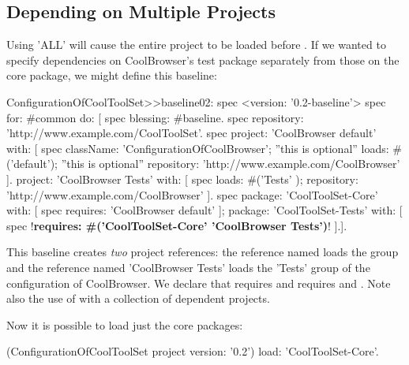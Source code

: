 \documentclass[a4paper,10pt,twoside]{book}
\begin{document}
\subsection{Depending on Multiple Projects}

Using 'ALL' will cause the entire  project to be loaded before .
If we wanted to specify dependencies on CoolBrowser's test package separately from those on the core package, we might define this baseline:

\begin{code}{}
ConfigurationOfCoolToolSet>>baseline02: spec
       <version: '0.2-baseline'>
       spec for: #common do: [
              spec blessing: #baseline.
              spec repository: 'http://www.example.com/CoolToolSet'.
              spec
                    project: 'CoolBrowser default' with: [
                            spec
                                   className: 'ConfigurationOfCoolBrowser'; ''this is optional''
                                   loads: #('default');  ''this is optional''
                                   repository: 'http://www.example.com/CoolBrowser' ].
                    project: 'CoolBrowser Tests' with: [
                            spec
                                   loads: #('Tests' );
                                   repository: 'http://www.example.com/CoolBrowser' ].
              spec
                     package: 'CoolToolSet-Core' with: [ spec requires: 'CoolBrowser default' ];
                     package: 'CoolToolSet-Tests' with: [
                            spec !\textbf{requires: \#('CoolToolSet-Core'  'CoolBrowser Tests')}! ].].
\end{code}

This baseline creates \emph{two} project references: the reference named  loads the  group and the reference named 'CoolBrowser Tests'  loads the 'Tests' group of the configuration of CoolBrowser. We declare that  requires  and  requires \mbox{} and . Note also the use of  with a collection of dependent projects.

Now it is possible to load just the core packages:

\begin{code}{}
(ConfigurationOfCoolToolSet project version: '0.2') load: 'CoolToolSet-Core'.
\end{code}
\end{document}
